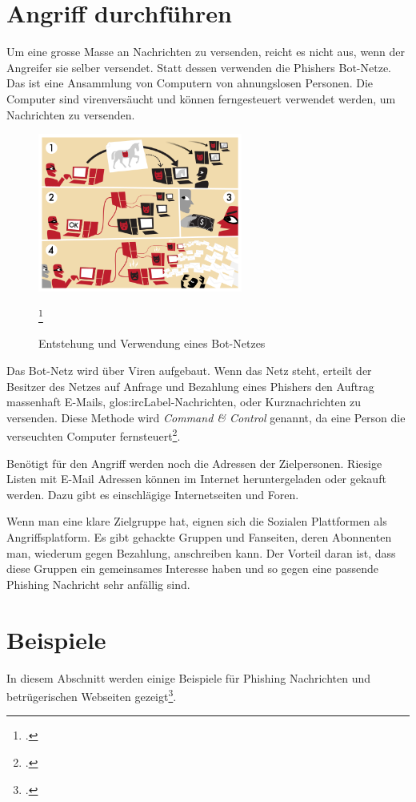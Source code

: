 \section{Angriff durchführen}
Um eine grosse Masse an Nachrichten zu versenden, reicht es nicht aus, wenn der Angreifer sie selber versendet. Statt dessen verwenden die Phishers Bot-Netze. Das ist eine Ansammlung von Computern von ahnungslosen Personen. Die Computer sind virenversäucht und können ferngesteuert verwendet werden, um Nachrichten zu versenden.
\begin{figure}[H]
  \centering
  \includegraphics[width=0.6\textwidth]{images/botnet.png}
  \caption{Entstehung und Verwendung eines Bot-Netzes}
  \footcite{Botnet__Wikipedia_2015-05-22}
  \label{fig:phishing:angriffdurchfueren:botnetz}
\end{figure}
Das Bot-Netz wird über Viren aufgebaut. Wenn das Netz steht, erteilt der Besitzer des Netzes auf Anfrage und Bezahlung eines Phishers den Auftrag massenhaft E-Mails, \Gls{glos:ircLabel}-Nachrichten, oder Kurznachrichten zu versenden. Diese Methode wird \textit{Command \& Control} genannt, da eine Person die verseuchten Computer fernsteuert\footcite{Botnet__Wikipedia_2015-05-22}.

Benötigt für den Angriff werden noch die Adressen der Zielpersonen. Riesige Listen mit E-Mail Adressen können im Internet heruntergeladen oder gekauft werden. Dazu gibt es einschlägige Internetseiten und Foren. 

Wenn man eine klare Zielgruppe hat, eignen sich die Sozialen Plattformen als Angriffsplatform. Es gibt gehackte Gruppen und Fanseiten, deren Abonnenten man, wiederum gegen Bezahlung, anschreiben kann. Der Vorteil daran ist, dass diese Gruppen ein gemeinsames Interesse haben und so gegen eine passende Phishing Nachricht sehr anfällig sind.

\section{Beispiele}
In diesem Abschnitt werden einige Beispiele für Phishing Nachrichten und betrügerischen Webseiten gezeigt\footcite{Was_sind_Phishing_emails_2015-05-22}.

